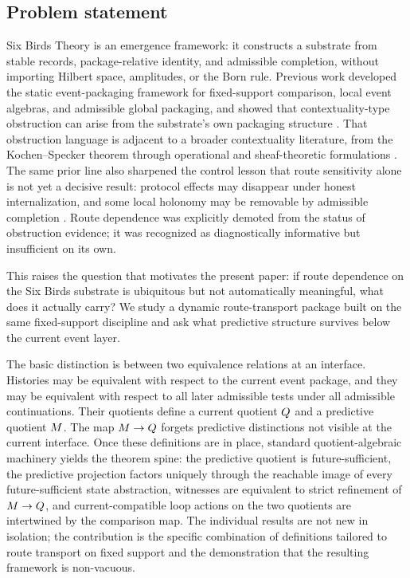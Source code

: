 \documentclass[11pt]{article}
\theoremstyle{definition}
\begin{document}
\subsection{Problem statement}\label{subsec:intro-problem}
Six Birds Theory \citep{Tsiokos2026Foundations} is an emergence framework: it constructs a substrate from stable records, package-relative identity, and admissible completion, without importing Hilbert space, amplitudes, or the Born rule. Previous work developed the static event-packaging framework for fixed-support comparison, local event algebras, and admissible global packaging, and showed that contextuality-type obstruction can arise from the substrate's own packaging structure \citep{Tsiokos2026EventPackages}. That obstruction language is adjacent to a broader contextuality literature, from the Kochen--Specker theorem through operational and sheaf-theoretic formulations \citep{KochenSpecker1968ProblemHiddenVariables,Spekkens2005Contextuality,AbramskyBrandenburger2011SheafTheoretic}. The same prior line also sharpened the control lesson that route sensitivity alone is not yet a decisive result: protocol effects may disappear under honest internalization, and some local holonomy may be removable by admissible completion \citep{Tsiokos2026ProtocolTrap,Tsiokos2026FlattenStone}. Route dependence was explicitly demoted from the status of obstruction evidence; it was recognized as diagnostically informative but insufficient on its own.

This raises the question that motivates the present paper: if route dependence on the Six Birds substrate is ubiquitous but not automatically meaningful, what does it actually carry? We study a dynamic route-transport package built on the same fixed-support discipline and ask what predictive structure survives below the current event layer.

The basic distinction is between two equivalence relations at an interface. Histories may be equivalent with respect to the current event package, and they may be equivalent with respect to all later admissible tests under all admissible continuations. Their quotients define a current quotient $Q$ and a predictive quotient $M$. The map $M \to Q$ forgets predictive distinctions not visible at the current interface. Once these definitions are in place, standard quotient-algebraic machinery yields the theorem spine: the predictive quotient is future-sufficient, the predictive projection factors uniquely through the reachable image of every future-sufficient state abstraction, witnesses are equivalent to strict refinement of $M \to Q$, and current-compatible loop actions on the two quotients are intertwined by the comparison map. The individual results are not new in isolation; the contribution is the specific combination of definitions tailored to route transport on fixed support and the demonstration that the resulting framework is non-vacuous.
\end{document}
